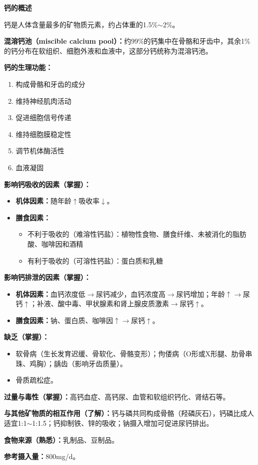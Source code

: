 \begin{keybox}
\textbf{钙的概述}

钙是人体含量最多的矿物质元素，约占体重的1.5\%$\sim$2\%。

\textbf{混溶钙池（miscible calcium pool）：}约99\%的钙集中在骨骼和牙齿中，其余1\%的钙分布在软组织、细胞外液和血液中，这部分钙统称为混溶钙池。

\textbf{钙的生理功能：}
\begin{enumerate}[leftmargin=*]
    \item 构成骨骼和牙齿的成分
    \item 维持神经肌肉活动
    \item 促进细胞信号传递
    \item 维持细胞膜稳定性
    \item 调节机体酶活性
    \item 血液凝固
\end{enumerate}

\difficulty \textbf{影响钙吸收的因素（掌握）：}
\begin{itemize}[leftmargin=*]
    \item \textbf{机体因素：}随年龄$\uparrow$吸收率$\downarrow$。
    \item \textbf{膳食因素：}
    \begin{itemize}[leftmargin=*]
        \item 不利于吸收的（难溶性钙盐）：植物性食物、膳食纤维、未被消化的脂肪酸、咖啡因和酒精
        \item 有利于吸收的（可溶性钙盐）：蛋白质和乳糖
    \end{itemize}
\end{itemize}

\textbf{影响钙排泄的因素（掌握）：}
\begin{itemize}[leftmargin=*]
    \item \textbf{机体因素：}血钙浓度低$\rightarrow$尿钙减少，血钙浓度高$\rightarrow$尿钙增加；年龄$\uparrow \rightarrow$尿钙$\uparrow$；补液、酸中毒、甲状腺素和肾上腺皮质激素$\rightarrow$尿钙$\uparrow$。
    \item \textbf{膳食因素：}钠、蛋白质、咖啡因$\uparrow \rightarrow$尿钙$\uparrow$。
\end{itemize}

\difficulty \textbf{缺乏（掌握）：}
\begin{itemize}[leftmargin=*]
    \item {}软骨病（生长发育迟缓、骨软化、骨骼变形）；佝偻病（O形或X形腿、肋骨串珠、鸡胸）；龋齿（影响牙齿质量）。
    \item {}骨质疏松症。
\end{itemize}

\difficulty \textbf{过量与毒性（掌握）：}高钙血症、高钙尿、血管和软组织钙化、肾结石等。

\textbf{与其他矿物质的相互作用（了解）：}钙与磷共同构成骨骼（羟磷灰石），钙磷比成人适宜1:1$\sim$1:1.5；钙抑制铁、锌的吸收；钠摄入增加可促进尿钙排出。

\textbf{食物来源（熟悉）：}乳制品、豆制品。

\textbf{参考摄入量：}800mg/d。
\end{keybox}

